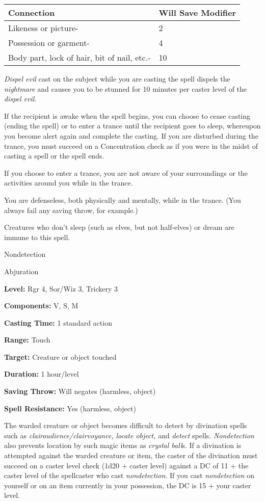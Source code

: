 \documentclass{article}
\begin{document}
\vspace{12pt}
\begin{tabular}{|>{\raggedright}p{152pt}|>{\raggedright}p{79pt}|}
\hline
C\textbf{onnection} & W\textbf{ill Save Modifier}\tabularnewline
\hline
Likeness or picture- & 2\tabularnewline
\hline
Possession or garment- & 4\tabularnewline
\hline
Body part, lock of hair, bit of nail, etc.- & 10\tabularnewline
\hline
\end{tabular}

\textit{Dispel evil }cast on the subject while you are casting the spell dispels 
the \textit{nightmare }and causes you to be stunned for 10 minutes per caster level 
of the \textit{dispel evil}.

If the recipient is awake when the spell begins, you can choose to cease casting 
(ending the spell) or to enter a trance until the recipient goes to sleep, whereupon 
you become alert again and complete the casting. If you are disturbed during the 
trance, you must succeed on a Concentration check as if you were in the midst of 
casting a spell or the spell ends.

If you choose to enter a trance, you are not aware of your surroundings or the 
activities around you while in the trance.

You are defenseless, both physically and mentally, while in the trance. (You always 
fail any saving throw, for example.)

Creatures who don't sleep (such as elves, but not half-elves) or dream are immune 
to this spell.

\vspace{12pt}
Nondetection

Abjuration

\textbf{Level:} Rgr 4, Sor/Wiz 3, Trickery 3

\textbf{Components:} V, S, M

\textbf{Casting Time:} 1 standard action

\textbf{Range:} Touch

\textbf{Target:} Creature or object touched

\textbf{Duration:} 1 hour/level

\textbf{Saving Throw: }Will negates (harmless, object)

\textbf{Spell Resistance:} Yes (harmless, object)

The warded creature or object becomes difficult to detect by divination spells 
such as \textit{clairaudience/clairvoyance, locate object, }and \textit{detect 
}spells. \textit{Nondetection }also prevents location by such magic items as \textit{crystal 
ball}s. If a divination is attempted against the warded creature or item, the caster 
of the divination must succeed on a caster level check (1d20 + caster level) against 
a DC of 11 + the caster level of the spellcaster who cast \textit{nondetection}. 
If you cast \textit{nondetection }on yourself or on an item currently in your possession, 
the DC is 15 + your caster level.
\end{document}
